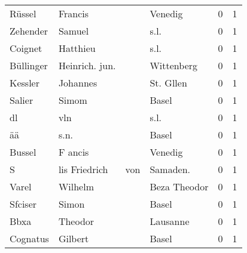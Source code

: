 \begin{center}
\begin{tiny}
\begin{longtabu}{llllrr}
                   Rüssel &                            Francis &             &                                     Venedig &          0 &         1 \\
                 Zehender &                             Samuel &             &                                        s.l. &          0 &         1 \\
                  Coignet &                           Hatthieu &             &                                        s.l. &          0 &         1 \\
                Büllinger &                     Heinrich. jun. &             &                                  Wittenberg &          0 &         1 \\
                  Kessler &                           Johannes &             &                                   St. Gllen &          0 &         1 \\
                   Salier &                              Simom &             &                                       Basel &          0 &         1 \\
                       dl &                                vln &             &                                        s.l. &          0 &         1 \\
                       ää &                               s.n. &             &                                       Basel &          0 &         1 \\
                   Bussel &                            F ancis &             &                                     Venedig &          0 &         1 \\
                        S &                      lis Friedrich &         von &                                   Samaden.  &          0 &         1 \\
                    Varel &                            Wilhelm &             &                                Beza Theodor &          0 &         1 \\
                  Sfciser &                              Simon &             &                                       Basel &          0 &         1 \\
                     Bbxa &                            Theodor &             &                                    Lausanne &          0 &         1 \\
                 Cognatus &                            Gilbert &             &                                       Basel &          0 &         1 \\

\end{longtabu}
\end{tiny}
\end{center}

